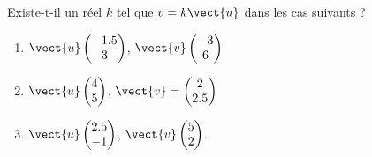
\begin{exercice}\label{exosmath-0688}

    Existe-t-il un réel \( k\) tel que \( v=k\vect{ u }\) dans les cas suivants ?
    \begin{multicols}{3}
        \begin{enumerate}
            \item
                \( \vect{ u }\begin{pmatrix}
                    -1.5    \\ 
                    3    
                \end{pmatrix}\), \( \vect{ v }\begin{pmatrix}
                    -3    \\ 
                    6    
                \end{pmatrix}\)
            \item
                \( \vect{ u }\begin{pmatrix}
                    4    \\ 
                    5    
                \end{pmatrix}\), \( \vect{ v }=\begin{pmatrix}
                    2    \\ 
                    2.5    
                \end{pmatrix}\)
            \item
                \( \vect{ u }\begin{pmatrix}
                    2.5    \\ 
                       -1 
                   \end{pmatrix}\), \( \vect{ v }\begin{pmatrix}
                       5 \\ 
                       2 
                   \end{pmatrix}\).
        \end{enumerate}
    \end{multicols}

\end{exercice}
